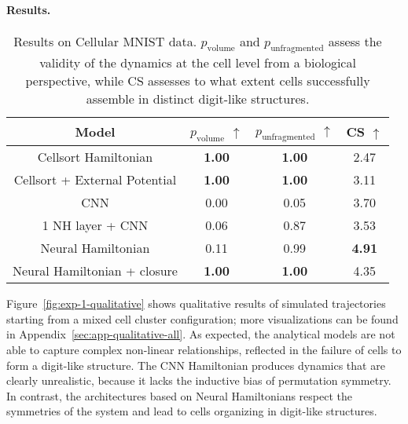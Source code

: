 \paragraph{Results.}

\begin{table}[t]
\centering
\footnotesize
\setlength{\tabcolsep}{1pt}
\caption{Results on Cellular MNIST data. $p_\text{volume}$ and $p_\text{unfragmented}$ assess the validity of the dynamics at the cell level from a biological perspective, while CS assesses to what extent cells successfully assemble in distinct digit-like structures.}
\vskip 0.15in
\label{tab:exp-1-metrics}
\begin{tabular}{@{}cccc@{}}
\toprule
Model                                    & $p_\text{volume}$ $\uparrow$ & $p_\text{unfragmented}$ $\uparrow$ & CS $\uparrow$ \\ \midrule
Cellsort Hamiltonian                     & \textbf{1.00}                         & \textbf{1.00}                                & 2.47          \\
Cellsort + External Potential & \textbf{1.00}                         & \textbf{1.00}                               & 3.11          \\
CNN                                      & 0.00                         & 0.05                               & 3.70          \\
1 NH layer + CNN         & 0.06                         & 0.87                               & 3.53          \\
Neural Hamiltonian                       & 0.11                         & 0.99                               & \textbf{4.91}          \\
Neural Hamiltonian + closure             & \textbf{1.00}                          & \textbf{1.00}                                & 4.35         \\ \bottomrule
\end{tabular}
\end{table}

Figure~\ref{fig:exp-1-qualitative} shows qualitative results of simulated trajectories starting from a mixed cell cluster configuration; more visualizations can be found in Appendix~\ref{sec:app-qualitative-all}. As expected, the analytical models are not able to capture complex non-linear relationships, reflected in the failure of cells to form a digit-like structure. The CNN Hamiltonian produces dynamics that are clearly unrealistic, because it lacks the inductive bias of permutation symmetry. In contrast, the architectures based on Neural Hamiltonians respect the symmetries of the system and lead to cells organizing in digit-like structures. 

